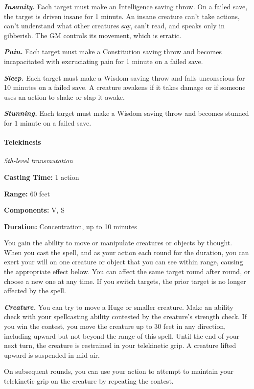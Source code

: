 \documentclass[
]{article}
\begin{document}
\emph{\textbf{Insanity.}} Each target must make an Intelligence saving
throw. On a failed save, the target is driven insane for 1 minute. An
insane creature can't take actions, can't understand what other
creatures say, can't read, and speaks only in gibberish. The GM controls
its movement, which is erratic.

\emph{\textbf{Pain.}} Each target must make a Constitution saving throw
and becomes incapacitated with excruciating pain for 1 minute on a
failed save.

\emph{\textbf{Sleep.}} Each target must make a Wisdom saving throw and
falls unconscious for 10 minutes on a failed save. A creature awakens if
it takes damage or if someone uses an action to shake or slap it awake.

\emph{\textbf{Stunning.}} Each target must make a Wisdom saving throw
and becomes stunned for 1 minute on a failed save.

\hypertarget{telekinesis}{%
\paragraph{Telekinesis}\label{telekinesis}}

\emph{5th-level transmutation}

\textbf{Casting Time:} 1 action

\textbf{Range:} 60 feet

\textbf{Components:} V, S

\textbf{Duration:} Concentration, up to 10 minutes

You gain the ability to move or manipulate creatures or objects by
thought. When you cast the spell, and as your action each round for the
duration, you can exert your will on one creature or object that you can
see within range, causing the appropriate effect below. You can affect
the same target round after round, or choose a new one at any time. If
you switch targets, the prior target is no longer affected by the spell.

\emph{\textbf{Creature.}} You can try to move a Huge or smaller
creature. Make an ability check with your spellcasting ability contested
by the creature's strength check. If you win the contest, you move the
creature up to 30 feet in any direction, including upward but not beyond
the range of this spell. Until the end of your next turn, the creature
is restrained in your telekinetic grip. A creature lifted upward is
suspended in mid-air.

On subsequent rounds, you can use your action to attempt to maintain
your telekinetic grip on the creature by repeating the contest.
\end{document}
